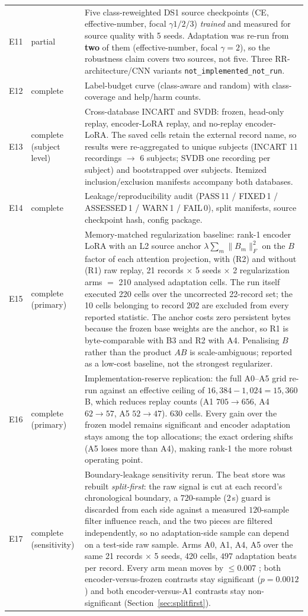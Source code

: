 \begin{longtable}{llp{7.2cm}}
E11 & partial & Five class-reweighted DS1 source checkpoints (CE, effective-number, focal $\gamma1/2/3$) \emph{trained} and measured for source quality with 5 seeds. Adaptation was re-run from \textbf{two} of them (effective-number, focal $\gamma{=}2$), so the robustness claim covers two sources, not five. Three RR-architecture/CNN variants \texttt{not\_implemented\_not\_run}. \\
E12 & complete & Label-budget curve (class-aware and random) with class-coverage and help/harm counts. \\
E13 & complete (subject level) & Cross-database INCART and SVDB: frozen, head-only replay, encoder-LoRA replay, and no-replay encoder-LoRA. The saved cells retain the external record name, so results were re-aggregated to unique subjects (INCART 11 recordings $\rightarrow$ 6 subjects; SVDB one recording per subject) and bootstrapped over subjects. Itemized inclusion/exclusion manifests accompany both databases. \\
E14 & complete & Leakage/reproducibility audit (PASS\,11 / FIXED\,1 / ASSESSED\,1 / WARN\,1 / FAIL\,0), split manifests, source checkpoint hash, config package. \\
E15 & complete (primary) & Memory-matched regularization baseline: rank-1 encoder LoRA with an L2 source anchor $\lambda\sum_m\|B_m\|_F^2$ on the $B$ factor of each attention projection, with (R2) and without (R1) raw replay, 21 records $\times$ 5 seeds $\times$ 2 regularization arms $=$ 210 analysed adaptation cells. The run itself executed 220 cells over the uncorrected 22-record set; the 10 cells belonging to record 202 are excluded from every reported statistic. The anchor costs zero persistent bytes because the frozen base weights are the anchor, so R1 is byte-comparable with B3 and R2 with A4. Penalising $B$ rather than the product $AB$ is scale-ambiguous; reported as a low-cost baseline, not the strongest regularizer. \\
E16 & complete (primary) & Implementation-reserve replication: the full A0--A5 grid re-run against an effective ceiling of $16{,}384 - 1{,}024 = 15{,}360$\,B, which reduces replay counts (A1 $705 \to 656$, A4 $62 \to 57$, A5 $52 \to 47$). 630 cells. Every gain over the frozen model remains significant and encoder adaptation stays among the top allocations; the exact ordering shifts (A5 loses more than A4), making rank-1 the more robust operating point. \\
E17 & complete (sensitivity) & Boundary-leakage sensitivity rerun. The beat store was rebuilt \emph{split-first}: the raw signal is cut at each record's chronological boundary, a $720$-sample ($2$\,s) guard is discarded from each side against a measured $120$-sample filter influence reach, and the two pieces are filtered independently, so no adaptation-side sample can depend on a test-side raw sample. Arms A0, A1, A4, A5 over the same 21 records $\times$ 5 seeds, 420 cells, $497$ adaptation beats per record. Every arm mean moves by $\le 0.007$ \macrof{}; both encoder-versus-frozen contrasts stay significant ($p = 0.0012$) and both encoder-versus-A1 contrasts stay non-significant (Section~\ref{sec:splitfirst}). \\
\end{longtable}
